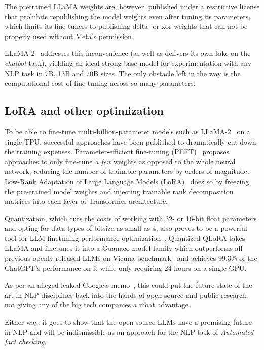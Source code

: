 The pretrained LLaMA weights are, however, published under a restrictive license that prohibits republishing the model weights even after tuning its parameters, which limits its fine-tuners to publishing delta- or xor-weights that can not be properly used without \textsf{Meta}'s permission.

LLaMA-2~\cite{llama2} addresses this inconvenience (as well as delivers its own take on the \textit{chatbot} task), yielding an ideal strong base model for experimentation with any NLP task in 7B, 13B and 70B sizes.
The only obstacle left in the way is the computational cost of fine-tuning across so many parameters.


\subsection{LoRA and other optimization}
To be able to fine-tune multi-billion-parameter models such as \textsf{LLaMA-2}~\cite{llama2} on a single TPU, successful approaches have been published to dramatically cut-down the training expenses.
Parameter-efficient fine-tuning (PEFT)~\cite{peft} proposes approaches to only fine-tune \textit{a few} weights as opposed to the whole neural network, reducing the number of trainable parameters by orders of magnitude.
Low-Rank Adaptation of Large Language Models (LoRA)~\cite{lora} does so by freezing the pre-trained model weights and injecting trainable rank decomposition matrices into each layer of Transformer architecture. 

Quantization, which cuts the costs of working with 32- or 16-bit float parameters and opting for data types of bitsize as small as 4, also proves to be a powerful tool for LLM finetuning performance optimization~\cite{dettmers2023qlora}.
Quantized QLoRA takes LLaMA and finetunes it into a Guanaco model family which outperforms all previous openly released LLMs on Vicuna benchmark~\cite{dettmers2023qlora} and achieves 99.3\% of the ChatGPT's performance on it while only requiring 24 hours on a single GPU.

As per an alleged leaked Google's memo~\cite{moat}, this could put the future state of the art in NLP disciplines back into the hands of open source and public research, not giving any of the big tech companies a \"{moat} advantage.

Either way, it goes to show that the open-source LLMs have a promising future in NLP and will be indismissible as an approach for the NLP task of \textit{Automated fact checking}.


